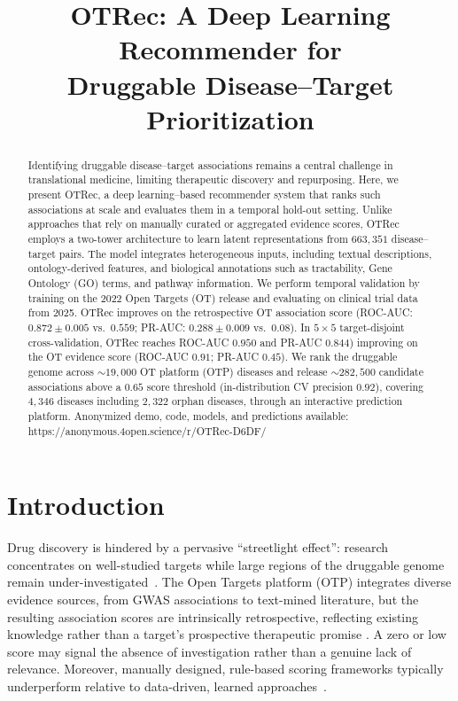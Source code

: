 \documentclass{article}
\begin{document}
\title{OTRec: A Deep Learning Recommender for\\
Druggable Disease--Target Prioritization}



\maketitle

\begin{abstract}
Identifying druggable disease--target associations remains a central
challenge in translational medicine, limiting therapeutic discovery and repurposing.
Here, we present OTRec, a deep learning--based recommender system that
ranks such associations at scale and evaluates them in a 
temporal hold-out setting.
Unlike approaches that rely on manually curated or aggregated evidence
scores, OTRec employs a two-tower architecture to learn latent
representations from $663{,}351$ disease--target pairs.
The model integrates heterogeneous inputs, including textual
descriptions, ontology-derived features, and biological annotations
such as tractability, Gene Ontology (GO) terms, and pathway information.
We perform temporal validation by training on the 2022 Open
Targets (OT) release and evaluating on clinical trial data from 2025.
OTRec improves on the retrospective OT association
score  (ROC-AUC: $0.872 \pm 0.005$ vs.\ $0.559$; PR-AUC: $0.288 \pm 0.009$ vs.\ $0.08$).
In $5{\times}5$ target-disjoint cross-validation, OTRec reaches
ROC-AUC $0.950$ and PR-AUC $0.844$) improving on the OT evidence score (ROC-AUC $0.91$; PR-AUC $0.45$).
We rank the druggable genome across ${\sim}19{,}000$
OT platform (OTP) diseases and release ${\sim}282{,}500$ candidate associations
above a $0.65$ score threshold (in-distribution CV precision $0.92$), covering
$4{,}346$ diseases including $2{,}322$ orphan diseases, through
an interactive prediction platform.
Anonymized demo, code, models, and predictions available: https://anonymous.4open.science/r/OTRec-D6DF/
\end{abstract}

\section{Introduction}

Drug discovery is hindered by a pervasive ``streetlight effect'':
research concentrates on well-studied targets while large regions of
the druggable genome remain under-investigated~\citep{buniello2025,richardson2023understudied,harel2018}.
The Open Targets platform (OTP) integrates diverse evidence sources, from
GWAS associations to text-mined literature, but the resulting association
scores are intrinsically retrospective, reflecting existing knowledge
rather than a target's prospective therapeutic promise \citep{koscielny_open_2017}.
A zero or low score may signal the absence of investigation rather than a
genuine lack of relevance.
Moreover, manually designed, rule-based scoring frameworks typically
underperform relative to data-driven, learned approaches~\citep{ulain2015mlscoring}.
\end{document}
